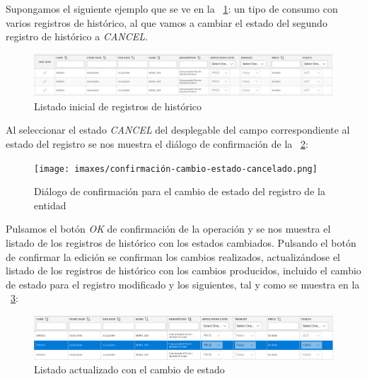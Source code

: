 Supongamos el siguiente ejemplo que se ve en la \figurename~\ref{fig:listado-tipos-cuotas-inicial}: un tipo de consumo con varios registros de histórico, al que vamos a cambiar el estado del segundo registro de histórico a \emph{CANCEL}.

\begin{figure}[H]
  \centering
  \includegraphics[width=\textwidth]{imaxes/listado-tipos-cuotas-inicial.png}
  \caption{Listado inicial de registros de histórico}
  \label{fig:listado-tipos-cuotas-inicial}
\end{figure}


Al seleccionar el estado \emph{CANCEL} del desplegable del campo correspondiente al estado del registro se nos muestra el diálogo de confirmación de la \figurename~\ref{fig:confirmación-cambio-estado-cancelado}:

\begin{figure}[H]
  \centering
  \texttt{[image: imaxes/confirmación-cambio-estado-cancelado.png]}
  \caption{Diálogo de confirmación para el cambio de estado del registro de la entidad}
  \label{fig:confirmación-cambio-estado-cancelado}
\end{figure}


Pulsamos el botón \emph{OK} de confirmación de la operación y se nos muestra el listado de los registros de histórico con los estados cambiados. Pulsando el botón de confirmar la edición se confirman los cambios realizados, actualizándose el listado de los registros de histórico con los cambios producidos, incluido el cambio de estado para el registro modificado y los siguientes, tal y como se muestra en la \figurename~\ref{fig:cambio-estado-cancelado}:

\begin{figure}[H]
  \centering
  \includegraphics[width=\textwidth]{imaxes/cambio-estado-cancelado.png}
  \caption{Listado actualizado con el cambio de estado}
  \label{fig:cambio-estado-cancelado}
\end{figure}




